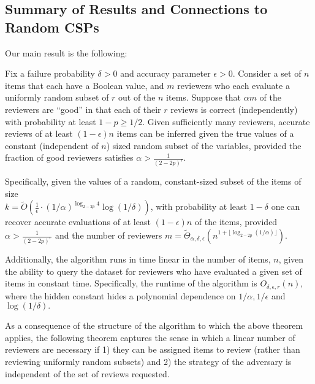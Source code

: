 \documentclass[anon,12pt]{colt2018}
\newcommand{\eps}{\epsilon}
\begin{document}

\subsection{Summary of Results and Connections to Random CSPs}\label{sec:sum}

Our main result is the following:
\begin{theorem}\label{thm:m}
Fix a failure probability $\delta>0$ and accuracy parameter $\eps > 0$.  Consider a set of $n$ items that each have a Boolean value, and $m$ reviewers who each evaluate a uniformly random subset of $r$ out of the $n$ items.  Suppose that $\alpha m$ of the reviewers are ``good'' in that each of their $r$ reviews is correct (independently) with probability at least $1-p\ge 1/2$.  Given sufficiently many reviewers, accurate reviews of at least $(1-\eps)n$ items can be inferred given the true values of a constant (independent of $n$) sized random subset of the variables, provided the fraction of good reviewers satisfies $\alpha >\frac{1}{(2-2p)^r}$.

Specifically, given the values of a random, constant-sized subset of the items of size \\$k=\tilde{O}\left(\frac{1}{\eps}\cdot (1/\alpha)^{\log_{2-2p} 4} \log(1/\delta)\right)$, with probability at least $1-\delta$  one can recover accurate evaluations of at least $(1-\eps)n$ of the items, provided $\alpha > \frac{1}{(2- 2p)^r}$ and the number of reviewers $m= \tilde{\Theta}_{\alpha,\delta,\eps}\left(n^{1+\lfloor \log_{2-2p}(1/\alpha)\rfloor}\right)$.  

Additionally, the algorithm runs in time linear in the number of items, $n$, given the ability to query the dataset for reviewers who have evaluated a given set of items in constant time.  Specifically, the runtime of the algorithm is $O_{\delta,\eps,r}(n),$ where the hidden constant hides a polynomial dependence on $1/\alpha, 1/\eps$ and $\log(1/\delta).$
\end{theorem}

As a consequence of the structure of the algorithm to which the above theorem applies, the following theorem captures the sense in which a linear number of reviewers are necessary if 1) they can be assigned items to review (rather than reviewing uniformly random subsets) and 2) the strategy of the adversary is independent of the set of reviews requested.
\end{document}
